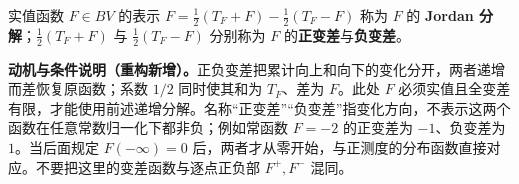 \documentclass[../../main.tex]{subfiles}%
\begin{document}
\begin{definition}\label{definition:ch03-function-jordan-decomposition}
实值函数 $F\in BV$ 的表示 $F=\tfrac12(T_F+F)-\tfrac12(T_F-F)$ 称为 $F$ 的 \textbf{Jordan 分解}；$\tfrac12(T_F+F)$ 与 $\tfrac12(T_F-F)$ 分别称为 $F$ 的\textbf{正变差}与\textbf{负变差}。
\end{definition}
\begin{remark}
\textbf{动机与条件说明（重构新增）。}正负变差把累计向上和向下的变化分开，两者递增而差恢复原函数；系数 $1/2$ 同时使其和为 $T_F$、差为 $F$。此处 $F$ 必须实值且全变差有限，才能使用前述递增分解。名称“正变差”“负变差”指变化方向，不表示这两个函数在任意常数归一化下都非负；例如常函数 $F=-2$ 的正变差为 $-1$、负变差为 $1$。当后面规定 $F(-\infty)=0$ 后，两者才从零开始，与正测度的分布函数直接对应。不要把这里的变差函数与逐点正负部 $F^+,F^-$ 混同。
\end{remark}
\end{document}
